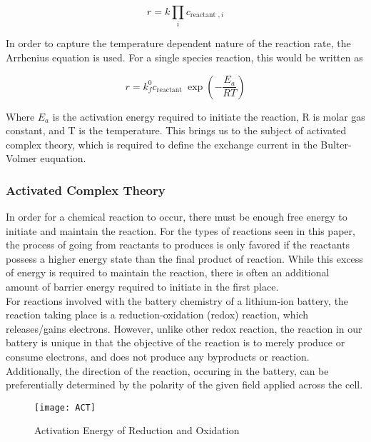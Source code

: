 \documentclass[lettersize,journal]{IEEEtran}
\begin{document}
\begin{equation}
r=k \prod_{i} c_{\text {reactant }, i}
\end{equation}

\noindent In order to capture the temperature dependent nature of the reaction rate, the Arrhenius equation is used. For a single species reaction, this would be written as

\begin{equation}
 r=k_{f}^{0} c_{\text {reactant }} \exp \left(-\frac{E_{a}}{R T}\right)
\end{equation}

\noindent Where $E_a$ is the activation energy required to initiate the reaction, R is molar gas constant, and T is the temperature. This brings us to the subject of activated complex theory, which is required to define the exchange current in the Bulter-Volmer euquation.\\

\subsubsection{Activated Complex Theory}

\noindent In order for a chemical reaction to occur, there must be enough free energy to initiate and maintain the reaction. For the types of reactions seen in this paper, the process of going from reactants to produces is only favored if the reactants possess a higher energy state than the final product of reaction. While this excess of energy is required to maintain the reaction, there is often an additional amount of barrier energy required to initiate in the first place. \\

For reactions involved with the battery chemistry of a lithium-ion battery, the reaction taking place is a reduction-oxidation (redox) reaction, which releases/gains electrons. However, unlike other redox reaction, the reaction in our battery is unique in that the objective of the reaction is to merely produce or consume electrons, and does not produce any byproducts or reaction. Additionally, the direction of the reaction, occuring in the battery, can be preferentially determined by the polarity of the given field applied across the cell. \\

\begin{figure}[H]
  \centering
  \texttt{[image: ACT]}
  \caption{Activation Energy of Reduction and Oxidation}
  \label{ACT_schematic}
\end{figure}
\end{document}
